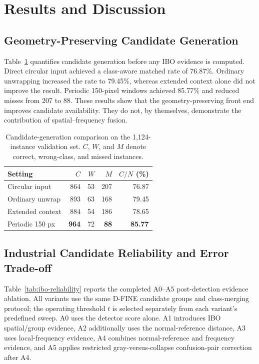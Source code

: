 \section{Results and Discussion}

\subsection{Geometry-Preserving Candidate Generation}

Table~\ref{tab:geometry} quantifies candidate generation before any IBO evidence is computed. Direct circular input achieved a class-aware matched rate of 76.87\%. Ordinary unwrapping increased the rate to 79.45\%, whereas extended context alone did not improve the result. Periodic 150-pixel windows achieved 85.77\% and reduced misses from 207 to 88. These results show that the geometry-preserving front end improves candidate availability. They do not, by themselves, demonstrate the contribution of spatial--frequency fusion.

\begin{table}[t]
\caption{Candidate-generation comparison on the 1,124-instance validation set. $C$, $W$, and $M$ denote correct, wrong-class, and missed instances.}
\label{tab:geometry}
\centering
\small
\begin{tabular}{lrrrr}
\toprule
Setting & $C$ & $W$ & $M$ & $C/N$ (\%) \\
\midrule
Circular input & 864 & 53 & 207 & 76.87 \\
Ordinary unwrap & 893 & 63 & 168 & 79.45 \\
Extended context & 884 & 54 & 186 & 78.65 \\
Periodic 150 px & \textbf{964} & 72 & \textbf{88} & \textbf{85.77} \\
\bottomrule
\end{tabular}
\end{table}

\subsection{Industrial Candidate Reliability and Error Trade-off}

Table~\ref{tab:ibo-reliability} reports the completed A0--A5 post-detection evidence ablation. All variants use the same D-FINE candidate groups and class-merging protocol; the operating threshold $t$ is selected separately from each variant's predefined sweep. A0 uses the detector score alone. A1 introduces IBO spatial/group evidence, A2 additionally uses the normal-reference distance, A3 uses local-frequency evidence, A4 combines normal-reference and frequency evidence, and A5 applies restricted gray-versus-collapse confusion-pair correction after A4.

